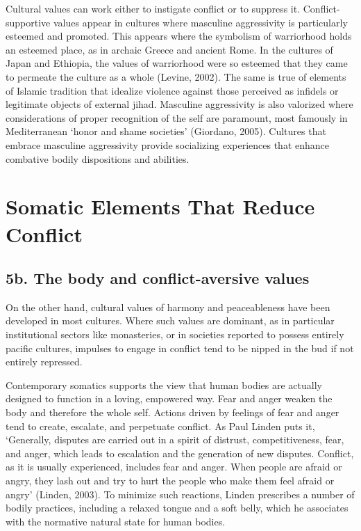 Cultural values can work either to instigate conflict or to suppress it. Conflict-supportive values appear in cultures where masculine aggressivity is particularly esteemed and promoted. This appears where the symbolism of warriorhood holds an esteemed place, as in archaic Greece and ancient Rome. In the cultures of Japan and Ethiopia, the values of warriorhood were so esteemed that they came to permeate the culture as a whole (Levine, 2002). The same is true of elements of Islamic tradition that idealize violence against those perceived as infidels or legitimate objects of external jihad. Masculine aggressivity is also valorized where considerations of proper recognition of the self are paramount, most famously in Mediterranean `honor and shame societies' (Giordano, 2005). Cultures that embrace masculine aggressivity provide socializing experiences that enhance combative bodily dispositions and abilities.

\section*{Somatic Elements That Reduce Conflict}

\subsection*{5b. The body and conflict-aversive values}

On the other hand, cultural values of harmony and peaceableness have been developed in most cultures. Where such values are dominant, as in particular institutional sectors like monasteries, or in societies reported to possess entirely pacific cultures, impulses to engage in conflict tend to be nipped in the bud if not entirely repressed.

Contemporary somatics supports the view that human bodies are actually designed to function in a loving, empowered way. Fear and anger weaken the body and therefore the whole self. Actions driven by feelings of fear and anger tend to create, escalate, and perpetuate conflict. As Paul Linden puts it, `Generally, disputes are carried out in a spirit of distrust, competitiveness, fear, and anger, which leads to escalation and the generation of new disputes. Conflict, as it is usually experienced, includes fear and anger. When people are afraid or angry, they lash out and try to hurt the people who make them feel afraid or angry' (Linden, 2003). To minimize such reactions, Linden prescribes a number of bodily practices, including a relaxed tongue and a soft belly, which he associates with the normative natural state for human bodies.

